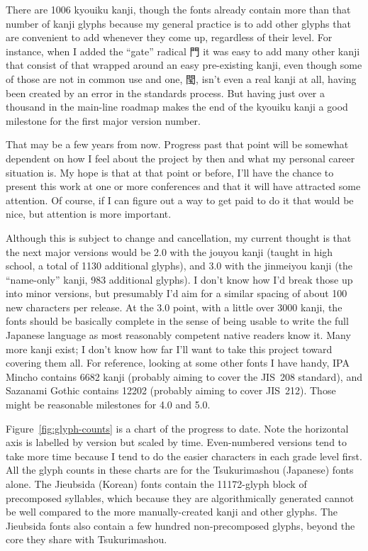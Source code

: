 \documentclass[14pt]{extarticle}
\begin{document}
There are 1006 kyouiku kanji, though the fonts already contain more than
that number of kanji glyphs because my general practice is to add other
glyphs that are convenient to add whenever they come up, regardless of their
level.  For instance, when I added the ``gate'' radical 門 it was easy to
add many other kanji that consist of that wrapped around an easy
pre-existing kanji, even though some of those are not in common use and one,
閠, isn't even a real kanji at all, having been created by an error in the
standards process.  But having just over a thousand in the main-line roadmap
makes the end of the kyouiku kanji a good milestone for the first major
version number.

That may be a few years from now.  Progress past that point will be somewhat
dependent on how I feel about the project by then and what my personal
career situation is.  My hope is that at that point or before, I'll have the
chance to present this work at one or more conferences and that it will have
attracted some attention.  Of course, if I can figure out a way to get paid
to do it that would be nice, but attention is more important.

Although this is subject to change and cancellation, my current thought is
that the next major versions would be 2.0 with the jouyou kanji (taught in
high school, a total of 1130 additional glyphs), and 3.0 with the jinmeiyou
kanji (the ``name-only'' kanji, 983 additional glyphs).  I don't know how
I'd break those up into minor versions, but presumably I'd aim for a similar
spacing of about 100 new characters per release.  At the 3.0 point, with a
little over 3000 kanji, the fonts should be basically complete in the sense
of being usable to write the full Japanese language as most reasonably
competent native readers know it.  Many more kanji exist; I don't know how
far I'll want to take this project toward covering them all.  For reference,
looking at some other fonts I have handy, IPA Mincho contains 6682 kanji
(probably aiming to cover the JIS~208 standard), and Sazanami Gothic
contains 12202 (probably aiming to cover JIS~212).  Those might be
reasonable milestones for 4.0 and 5.0.

Figure~\ref{fig:glyph-counts} is a chart of the progress to date.  Note the
horizontal axis is labelled by version but scaled by time.  Even-numbered
versions tend to take more time because I tend to do the easier characters
in each grade level first.  All the glyph counts in these charts are for the
Tsukurimashou (Japanese) fonts alone.  The Jieubsida (Korean) fonts contain
the 11172-glyph block of precomposed syllables, which because they are
algorithmically generated cannot be well compared to the more
manually-created kanji and other glyphs.  The Jieubsida fonts also contain a
few hundred non-precomposed glyphs, beyond the core they share with
Tsukurimashou.
\end{document}
